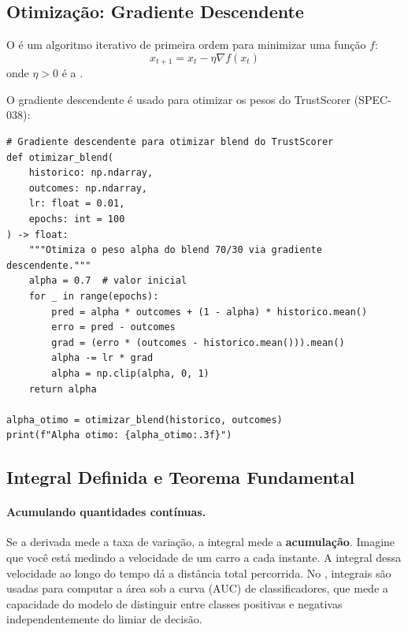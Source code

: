 \subsection{Otimização: Gradiente Descendente}

\begin{definicao}
    O  é um algoritmo iterativo de primeira
    ordem para minimizar uma função $f$:
    \[
    x_{t+1} = x_t - \eta \nabla f(x_t)
    \]
    onde $\eta > 0$ é a .
\end{definicao}

\begin{exemplo}
    O gradiente descendente é usado para otimizar os pesos do TrustScorer
    (SPEC-038):
    \begin{lstlisting}[style=pythonstyle]
# Gradiente descendente para otimizar blend do TrustScorer
def otimizar_blend(
    historico: np.ndarray,
    outcomes: np.ndarray,
    lr: float = 0.01,
    epochs: int = 100
) -> float:
    """Otimiza o peso alpha do blend 70/30 via gradiente descendente."""
    alpha = 0.7  # valor inicial
    for _ in range(epochs):
        pred = alpha * outcomes + (1 - alpha) * historico.mean()
        erro = pred - outcomes
        grad = (erro * (outcomes - historico.mean())).mean()
        alpha -= lr * grad
        alpha = np.clip(alpha, 0, 1)
    return alpha

alpha_otimo = otimizar_blend(historico, outcomes)
print(f"Alpha otimo: {alpha_otimo:.3f}")
    \end{lstlisting}
\end{exemplo}

\subsection{Integral Definida e Teorema Fundamental}

\paragraph{Acumulando quantidades contínuas.} Se a derivada mede a taxa de
variação, a integral mede a \textbf{acumulação}. Imagine que você está
medindo a velocidade de um carro a cada instante. A integral dessa
velocidade ao longo do tempo dá a distância total percorrida. No
\opencodeeco{}, integrais são usadas para computar a área sob a curva (AUC)
de classificadores, que mede a capacidade do modelo de distinguir entre
classes positivas e negativas independentemente do limiar de decisão.

